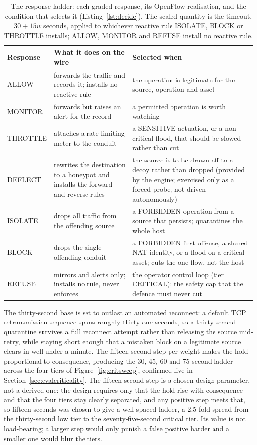 \begin{table}[t]
\centering
\small
\begin{tabular}{lp{}p{}}
\hline
Response & What it does on the wire & Selected when \\
\hline
ALLOW & forwards the traffic and records it; installs no reactive rule & the operation is legitimate for the source, operation and asset \\
MONITOR & forwards but raises an alert for the record & a permitted operation is worth watching \\
THROTTLE & attaches a rate-limiting meter to the conduit & a SENSITIVE actuation, or a non-critical flood, that should be slowed rather than cut \\
DEFLECT & rewrites the destination to a honeypot and installs the forward and reverse rules & the source is to be drawn off to a decoy rather than dropped (provided by the engine; exercised only as a forced probe, not driven autonomously) \\
ISOLATE & drops all traffic from the offending source & a FORBIDDEN operation from a source that persists; quarantines the whole host \\
BLOCK & drops the single offending conduit & a FORBIDDEN first offence, a shared NAT identity, or a flood on a critical asset; cuts the one flow, not the host \\
REFUSE & mirrors and alerts only; installs no rule, never enforces & the operator control loop (tier CRITICAL); the safety cap that the defence must never cut \\
\hline
\end{tabular}
\caption[The seven-response ladder]{The response ladder: each graded response, its OpenFlow realisation, and the condition that selects it (Listing~\ref{lst:decide}). The scaled quantity is the timeout, $30+15w$ seconds, applied to whichever reactive rule ISOLATE, BLOCK or THROTTLE installs; ALLOW, MONITOR and REFUSE install no reactive rule.}
\label{tab:ladder}
\end{table} The thirty-second base is set to outlast an automated reconnect: a default TCP retransmission sequence spans roughly thirty-one seconds, so a thirty-second quarantine survives a full reconnect attempt rather than releasing the source mid-retry, while staying short enough that a mistaken block on a legitimate source clears in well under a minute. The fifteen-second step per weight makes the hold proportional to consequence, producing the 30, 45, 60 and 75 second ladder across the four tiers of Figure~\ref{fig:critsweep}, confirmed live in Section~\ref{sec:evalcriticality}. The fifteen-second step is a chosen design parameter, not a derived one: the design requires only that the hold rise with consequence and that the four tiers stay clearly separated, and any positive step meets that, so fifteen seconds was chosen to give a well-spaced ladder, a 2.5-fold spread from the thirty-second low tier to the seventy-five-second critical tier. Its value is not load-bearing; a larger step would only punish a false positive harder and a smaller one would blur the tiers.

